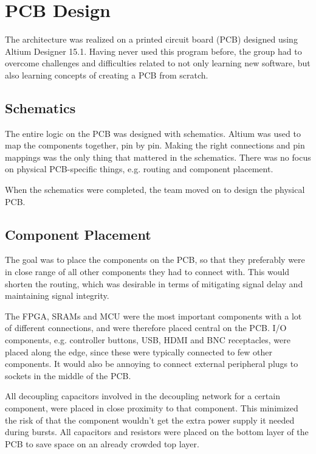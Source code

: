 \section{PCB Design}
The architecture was realized on a printed circuit board (PCB) designed using Altium Designer 15.1.
Having never used this program before, the group had to overcome challenges and difficulties related to not only learning new software, but also learning concepts of creating a PCB from scratch. 

\subsection{Schematics}
The entire logic on the PCB was designed with schematics. 
Altium was used to map the components together, pin by pin. 
Making the right connections and pin mappings was the only thing that mattered in the schematics. 
There was no focus on physical PCB-specific things, e.g. routing and component placement.

When the schematics were completed, the team moved on to design the physical PCB.

\subsection{Component Placement}
The goal was to place the components on the PCB, so that they preferably were in close range of all other components they had to connect with. 
This would shorten the routing, which was desirable in terms of mitigating signal delay and maintaining signal integrity.

The FPGA, SRAMs and MCU were the most important components with a lot of different connections, and were therefore placed central on the PCB.
I/O components, e.g. controller buttons, USB, HDMI and BNC receptacles, were placed along the edge, since these were typically connected to few other components.
It would also be annoying to connect external peripheral plugs to sockets in the middle of the PCB.

All decoupling capacitors involved in the decoupling network for a certain component, were placed in close proximity to that component.
This minimized the risk of that the component wouldn't get the extra power supply it needed during bursts.
All capacitors and resistors were placed on the bottom layer of the PCB to save space on an already crowded top layer.

